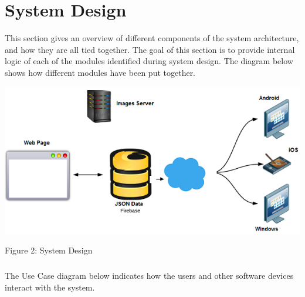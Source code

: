 \chapter{System Design}
This section gives an overview of different components of the system architecture, and how they are all tied together. The goal of this section is to provide internal logic of each of the modules identified during system design. The diagram below shows how different modules have been put together.

\begin{center}    
	\includegraphics{img/diagram.png}
\end{center}
\begin{center}
	Figure 2: System Design
\end{center}
\paragraph{}
The Use Case diagram below indicates how the users and other software devices interact with the system.
\paragraph{}
